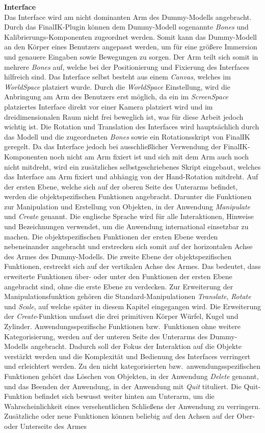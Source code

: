 \noindent \textbf{Interface}\\
Das Interface wird am nicht dominanten Arm des Dummy-Modells angebracht. Durch das FinalIK-Plugin können dem Dummy-Modell sogenannte \textit{Bones} und Kalibrierungs-Komponenten zugeordnet werden. Somit kann das Dummy-Modell an den Körper eines Benutzers angepasst werden, um für eine größere Immersion und genauere Eingaben sowie Bewegungen zu sorgen. Der Arm teilt sich somit in mehrere \textit{Bones} auf, welche bei der Positionierung und Fixierung des Interfaces hilfreich sind. Das Interface selbst besteht aus einem \textit{Canvas}, welches im \textit{WorldSpace} platziert wurde. Durch die \textit{WorldSpace} Einstellung, wird die Anbringung am Arm des Benutzers erst möglich, da ein im \textit{ScreenSpace} platziertes Interface direkt vor einer Kamera platziert wird und im dreidimensionalen Raum nicht frei beweglich ist, was für diese Arbeit jedoch wichtig ist. Die Rotation und Translation des Interfaces wird hauptsächlich durch das Modell und die zugeordneten \textit{Bones} sowie ein Rotationsskript von FinalIK geregelt. Da das Interface jedoch bei ausschließlicher Verwendung der FinalIK-Komponenten noch nicht am Arm fixiert ist und sich mit dem Arm auch noch nicht mitdreht, wird ein zusätzliches selbstgeschriebenes Skript eingebaut, welches das Interface am Arm fixiert und abhängig von der Hand-Rotation mitdreht. Auf der ersten Ebene, welche sich auf der oberen Seite des Unterarms befindet, werden die objektspezifischen Funktionen angebracht. Darunter die Funktionen zur Manipulation und Erstellung von Objekten, in der Anwendung \textit{Manipulate} und \textit{Create} genannt. Die englische Sprache wird für alle Interaktionen, Hinweise und Bezeichnungen verwendet, um die Anwendung international einsetzbar zu machen. Die objektspezifischen Funktionen der ersten Ebene werden nebeneinander angebracht und erstrecken sich somit auf der horizontalen Achse des Armes des Dummy-Modells. Die zweite Ebene der objektspezifischen Funktionen, erstreckt sich auf der vertikalen Achse des Armes. Das bedeutet, dass erweiterte Funktionen über- oder unter den Funktionen der ersten Ebene angebracht sind, ohne die erste Ebene zu verdecken. Zur Erweiterung der Manipulationsfunktion gehören die Standard-Manipulationen \textit{Translate}, \textit{Rotate} und \textit{Scale}, auf welche später in diesem Kapitel eingegangen wird. Die Erweiterung der \textit{Create}-Funktion umfasst die drei primitiven Körper Würfel, Kugel und Zylinder. Anwendungsspezifische Funktionen bzw.~Funktionen ohne weitere Kategorisierung, werden auf der unteren Seite des Unterarms des Dummy-Modells angebracht. Dadurch soll der Fokus der Interaktion auf die Objekte verstärkt werden und die Komplexität und Bedienung des Interfaces verringert und erleichtert werden. Zu den nicht kategorisierten bzw.~anwendungsspezifischen Funktionen gehört das Löschen von Objekten, in der Anwendung \textit{Delete} genannt, und das Beenden der Anwendung, in der Anwendung mit \textit{Quit} tituliert. Die Quit-Funktion befindet sich bewusst weiter hinten am Unterarm, um die Wahrscheinlichkeit eines versehentlichen Schließens der Anwendung zu verringern. Zusätzliche oder neue Funktionen können beliebig auf den Achsen auf der Ober- oder Unterseite des Armes 